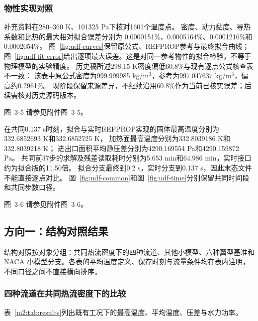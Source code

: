\documentclass[UTF8]{midterm}
\makeatletter
\newcommand{\submissionnumber}[1]{\def\@currentlabel{#1}}
\makeatother
\begin{document}
\subsubsection{物性实现对照}
补充资料在280--360 K、101325 Pa下核对1601个温度点。
密度、动力黏度、导热系数和比热的最大相对拟合误差分别为
0.0000151\%、0.0005164\%、0.0001216\%和0.0002054\%。
图~\ref{fig:udf-curves}保留原公式、REFPROP参考与最终拟合曲线；
图~\ref{fig:udf-fit-error}给出逐项最大误差。这是对同一参考物性的拟合检验，不等于物理模型的实验精度。
历史稿所述298.15 K密度偏低60.8\%与现有逐点公式核查表不一致：
该表中原公式密度为999.999985 kg/m$^3$，参考为997.047637 kg/m$^3$，偏高约0.2961\%。
现阶段保留来源差异，不继续沿用60.8\%作为当前已核实误差；后续需核对历史源码版本。


\par\noindent \begingroup\submissionnumber{3-5a}\label{fig:udf-curves}\endgroup \begingroup\submissionnumber{3-5b}\label{fig:udf-fit-error}\endgroup 图~3-5 请参见附件图~3-5。\par


在共同0.137 s时刻，拟合与实时REFPROP实现的固体最高温度分别为332.6852693 K和332.6852725 K，
加热面最高温度分别为332.8039186 K和332.8039218 K；
进出口面积平均静压差分别为4290.169554 Pa和4290.159872 Pa。
共同前37步的求解及残差读取耗时分别为5.653 min和64.986 min，实时接口约为拟合版的11.50倍。
拟合分支最终到0.2 s，实时分支到0.137 s，因此末态文件不能直接逐点对比。
图~\ref{fig:udf-common}和图~\ref{fig:udf-time}分别保留共同时间段和共同步数口径。


\par\noindent \begingroup\submissionnumber{3-6a}\label{fig:udf-common}\endgroup \begingroup\submissionnumber{3-6b}\label{fig:udf-time}\endgroup 图~3-6 请参见附件图~3-6。\par




\subsection{方向一：结构对照结果}
结构对照按对象分组：共同热流密度下的四种流道、其他小模型、六种翼型基准和 NACA 小模型分支。各表的平均温度定义、保存时刻与流量条件均在表内注明，不同口径之间不直接横向排序。
\subsubsection{四种流道在共同热流密度下的比较}

表~\ref{m2:tab:results}列出既有工况下的最高温度、平均温度、压差与水力功率。
\end{document}
